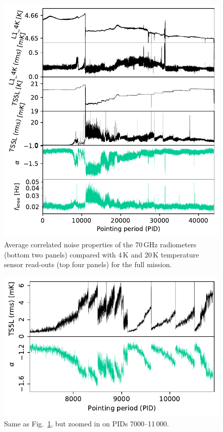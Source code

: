 \documentclass[twocolumn]{aa}
\begin{document}
\begin{figure}
	\begin{center}
		\includegraphics[width=\linewidth]{figs/hk_band_TS5L_070.pdf}
	\end{center}
	\caption{Average correlated noise properties of the 70\,GHz radiometers
          (bottom two panels) compared with 4\,K and 20\,K temperature sensor
          read-outs (top four panels) for the full mission.
		\label{fig:hk_TSL_70_full}}
\end{figure}

\begin{figure}
	\begin{center}
		\includegraphics[width=\linewidth]{figs/hk_band_TS5L_070_zoom.pdf}
	\end{center}
	\caption{Same as Fig.~\ref{fig:hk_TSL_70_full}, but zoomed in
          on PIDs 7000--11\,000.
		\label{fig:hk_TSL_70_zoom}}
\end{figure}
\end{document}
